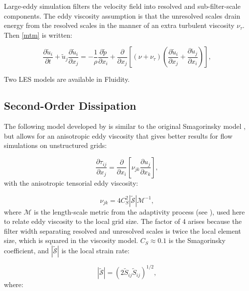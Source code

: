 Large-eddy simulation filters the velocity field into resolved and sub-filter-scale components. The eddy viscosity assumption is that the unresolved scales drain energy from the resolved scales in the manner of an extra turbulent viscosity $\nu_\tau$. Then \eqref{mtm} is written:

\begin{equation}
\frac{\partial \tilde u_i}{\partial t} + \tilde u_j \frac{\partial \tilde u_i}{\partial x_j}
 = -\frac 1 \rho \frac{\partial \tilde p}{\partial x_i}
 + \frac{\partial}{\partial x_j} \left [ (\nu + \nu_\tau) \left ( \frac{\partial \tilde u_i}{\partial x_j} + \frac{\partial \tilde u_j}{\partial x_i} \right ) \right ],
\end{equation}

Two LES models are available in Fluidity.

\subsection{Second-Order Dissipation}

The following model developed by \citet{bentham2003} is similar to the original Smagorinsky model \citep{smagorinsky1963general}, but allows for an anisotropic eddy viscosity that gives better results for flow simulations on unstructured grids:

\begin{equation}
\frac{\partial \tau_{ij}}{\partial x_j} = \frac{\partial}{\partial x_i} \left [ \nu_{jk}\frac{\partial u_j}{\partial x_k} \right ],
\end{equation}
with the anisotropic tensorial eddy viscosity:

\begin{equation}
\nu_{jk} = 4C_S^2 \left | \mathcal{\tilde S} \right | \mathcal{M}^{-1},
\end{equation}
where $\mathcal{M}$ is the length-scale metric from the adaptivity process (see \citet{pain2001}), used here to relate eddy viscosity to the local grid size. The factor of 4 arises because the filter width separating resolved and unresolved scales is twice the local element size, which is squared in the viscosity model. $C_S \approx 0.1$ is the Smagorinsky coefficient, and $\left | \mathcal{\tilde S} \right |$ is the local strain rate:

\begin{equation}
\left | \mathcal{\tilde S} \right | = (2 \tilde S_{ij} \tilde S_{ij})^{1/2},
\end{equation}
where:

